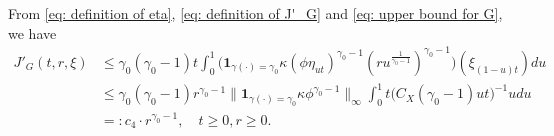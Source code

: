 \documentclass[12pt, a4paper]{amsart}
\theoremstyle{definition}
\numberwithin{equation}{section}
\begin{document}
	From \eqref{eq: definition of eta}, \eqref{eq: definition of J'_G} and \eqref{eq: upper bound for G}, we have
\[\label{eq: upper bound for J'_G} \begin{split}
	J'_G(t,r,\xi)
	&\leq \gamma_0 (\gamma_0 - 1) t \int_0^1 \big( \mathbf 1_{\gamma(\cdot) = \gamma_0} \kappa (\phi \eta_{ut})^{\gamma_0 - 1} (ru^{\frac{1}{\gamma_0 - 1}})^{\gamma_0 - 1}\big) (\xi_{(1-u)t}) du
	\\&\leq \gamma_0(\gamma_0 - 1) r^{\gamma_0 - 1} \big\|   \mathbf 1_{\gamma(\cdot) = \gamma_0}  \kappa \phi^{\gamma_0 - 1} \big\|_\infty \int_0^1 t \big(  C_X(\gamma_0 - 1) ut \big)^{- 1}  u  du
	\\&=: c_4 \cdot r^{\gamma_0 - 1},
	\quad t\geq 0, r\geq 0.
\end{split}\]
\end{document}
